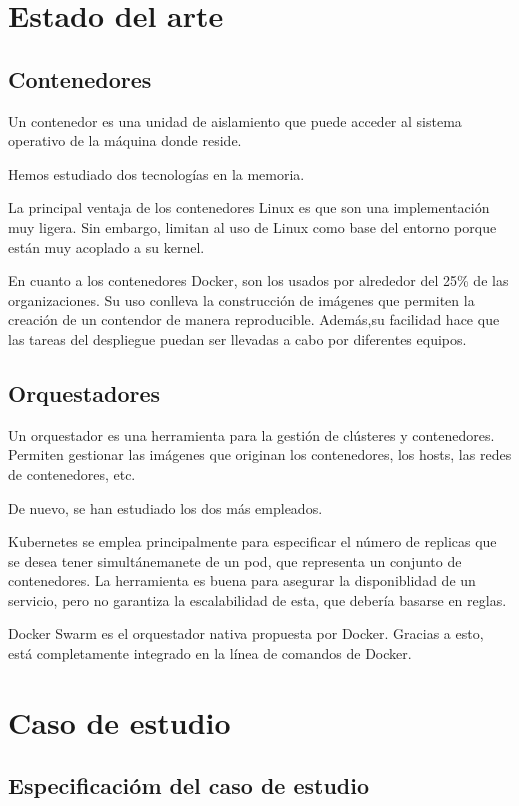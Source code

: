 \documentclass[11pt,a4paper]{article}
\begin{document}
\section{Estado del arte}


\subsection{Contenedores}
Un contenedor es una unidad de aislamiento que puede acceder al sistema operativo de la máquina donde reside.

Hemos estudiado dos tecnologías en la memoria.

La principal ventaja de los contenedores Linux es que son una implementación muy ligera. Sin embargo, limitan al uso de Linux como base del entorno porque están muy acoplado a su kernel. 

En cuanto a los contenedores Docker, son los usados por alrededor del 25\% de las organizaciones. Su uso conlleva la construcción de imágenes que permiten la creación de un contendor de manera reproducible. Además,su facilidad hace que las tareas del despliegue puedan ser llevadas a cabo por diferentes equipos.

\subsection{Orquestadores}

Un orquestador  es una herramienta para la gestión de clústeres y contenedores. Permiten gestionar las imágenes que originan los contenedores, los hosts, las redes de contenedores, etc.

De nuevo, se han estudiado los dos más empleados.

Kubernetes se emplea principalmente para especificar el número de replicas que se desea tener simultánemanete de un pod, que representa un conjunto de contenedores. La herramienta es buena para asegurar la disponiblidad de un servicio, pero no garantiza la escalabilidad de esta, que debería basarse en reglas.

Docker Swarm es el orquestador nativa propuesta por Docker. Gracias a esto, está completamente integrado en la línea de comandos de Docker.

\section{Caso de estudio}

\subsection{Especificacióm del caso de estudio}
\end{document}
